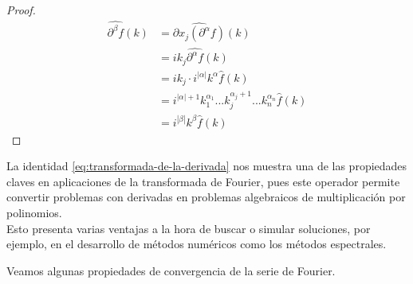 \begin{proof}
      \begin{align*}
        \hat{\partial ^{\beta}f}(k) &= \hat{\partial x_{j}(\partial^{\alpha}f)}(k)\\
        &= ik_{j} \widehat{\partial ^{\alpha}f}(k)\\ 
        &= ik_{j} \cdot i^{|\alpha|} k^{\alpha} \widehat{f}(k)\\
        &= i^{|\alpha|+1} k_{1}^{\alpha_{1}}...k_{j}^{\alpha_{j}+1}...k_{n}^{\alpha_{n}} \widehat{f}(k)\\ 
        &= i^{|\beta|} k^{\beta} \widehat{f}(k)
      \end{align*}  
    \end{proof}
    \begin{note}
      La identidad \textcolor{red}{\ref{eq:transformada-de-la-derivada}} nos muestra una de las propiedades claves en aplicaciones de la transformada de Fourier, pues este operador permite convertir problemas con derivadas en problemas algebraicos de multiplicación por polinomios.\\
      Esto presenta varias ventajas a la hora de buscar o simular soluciones, por ejemplo, en el desarrollo de métodos numéricos como los métodos espectrales.
    \end{note}
    Veamos algunas propiedades de convergencia de la serie de Fourier.
